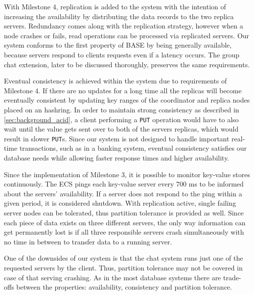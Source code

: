 With Milestone 4, replication is added to the system with the intention of increasing the availability by distributing the data records to the two replica servers. Redundancy comes along with the replication strategy, however when a node crashes or fails, read operations can be processed via replicated servers.
Our system conforms to the first property of BASE by being generally available, because servers respond to clients requests even if a latency occurs. The group chat extension, later to be discussed thoroughly, preserves the same requirements.

Eventual consistency is achieved within the system due to requirements of Milestone 4. If there are no updates for a long time all the replicas will become eventually consistent by updating key ranges of the coordinator and replica nodes placed on an hashring. In order to maintain strong consistency as described in \ref{sec:background_acid}, a client performing a \texttt{PUT} operation would have to also wait until the value gets sent over to both of the servers replicas, which would result in slower \texttt{PUT}s. Since our system is not designed to handle important real-time transactions, such as in a banking system, eventual consistency satisfies our database needs while allowing faster response times and higher availability. 

Since the implementation of Milestone 3, it is possible to monitor key-value stores continuously. The ECS pings each key-value server every 700 ms to be informed about the servers’ availability. If a server does not respond to the ping within a given period, it is considered shutdown. With replication active, single failing server nodes can be tolerated, thus partition tolerance is provided as well. Since each piece of data exists on three different servers, the only way information can get permanently lost is if all three responsible servers crash simultaneously with no time in between to transfer data to a running server.

One of the downsides of our system is that the chat system runs just one of the requested servers by the client. Thus, partition tolerance may not be covered in case of that serving crashing. As in the most database systems there are trade-offs between the properties: availability, consistency and partition tolerance.



